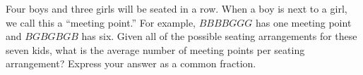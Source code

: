 Four boys and three girls will be seated in a row. When a boy is next to a girl, we call this a ``meeting point.'' For example, $BBBBGGG$ has one meeting point and $BGBGBGB$ has six. Given all of the possible seating arrangements for these seven kids, what is the average number of meeting points per seating arrangement? Express your answer as a common fraction.
